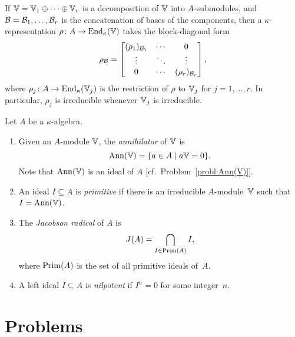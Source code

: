 \begin{prop}\label{prop:representation-decomposition}
    If\/ $\mathbb V = \mathbb V_1 \oplus \cdots \oplus \mathbb V_r$ is a decomposition of\/ $\mathbb V$ into\/ $A$-submodules, and\/ $\mathcal B = \mathcal B_1, \dots, \mathcal B_r$ is the concatenation of bases of the components, then a\/ $\kappa$-representation\/ $\rho\colon A\to{\operatorname{End}}_\kappa(\mathbb V)$ takes the block-diagonal form
    \begin{equation}\label{eq:block-diagonal-representation}
        \rho_{\mathcal B} = \begin{bmatrix}
            (\rho_1)_{\mathcal B_1}  &\cdots &0\\
            \vdots  &\ddots &\vdots\\
            0   &\cdots &(\rho_r)_{\mathcal B_r}
        \end{bmatrix},
    \end{equation}
    where\/ $\rho_j\colon A\to{\operatorname{End}}_\kappa(\mathbb V_j)$ is the restriction of\/ $\rho$ to\/ $\mathbb V_j$ for\/ $j = 1, \dots, r$. In particular,\/ $\rho_j$ is irreducible whenever\/ $\mathbb V_j$ is irreducible. 
\end{prop}

\begin{defns}\label{defns:Jacobson-radical}
    Let $A$ be a $\kappa$-algebra.
    \begin{enumerate}[-]
        \item Given an $A$-module $\mathbb V$, the \textsl{annihilator} of $\mathbb V$ is
        $$
            \operatorname{\operatorname{Ann}}(\mathbb V) = \{a\in A\mid a\mathbb V=0\}.
        $$
        Note that $\operatorname{\operatorname{Ann}}(\mathbb V)$ is an ideal of $A$ [cf.~Problem~\ref{probl:Ann(V)}].

        \item An ideal $I\subseteq A$ is \textsl{primitive} if there is an irreducible $A$-module~$\mathbb V$ such that $I=\operatorname{\operatorname{Ann}}(\mathbb V)$.

        \item The \textsl{Jacobson radical} of $A$ is
        $$
            J(A) = \bigcap_{I\in\operatorname{Prim}(A)}I,
        $$
        where $\operatorname{Prim}(A)$ is the set of all primitive ideals of~$A$.

        \item A left ideal $I\subseteq A$ is \textsl{nilpotent} if $I^n=0$ for some integer~$n$.
    \end{enumerate}
\end{defns}


\section{Problems}

